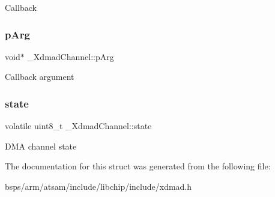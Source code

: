 Callback \mbox{\label{struct__XdmadChannel_ac40b54db72c5916ccdc24f0505c99d5b}} 
\subsubsection{\texorpdfstring{pArg}{pArg}}
{\footnotesize\ttfamily void$\ast$ \+\_\+\+Xdmad\+Channel\+::p\+Arg}

Callback argument \mbox{\label{struct__XdmadChannel_a42ebc62f45f06c99062faaf7dbc313b5}} 
\subsubsection{\texorpdfstring{state}{state}}
{\footnotesize\ttfamily volatile uint8\+\_\+t \+\_\+\+Xdmad\+Channel\+::state}

D\+MA channel state 

The documentation for this struct was generated from the following file\+:\begin{DoxyCompactItemize}
\item 
bsps/arm/atsam/include/libchip/include/xdmad.\+h\end{DoxyCompactItemize}
